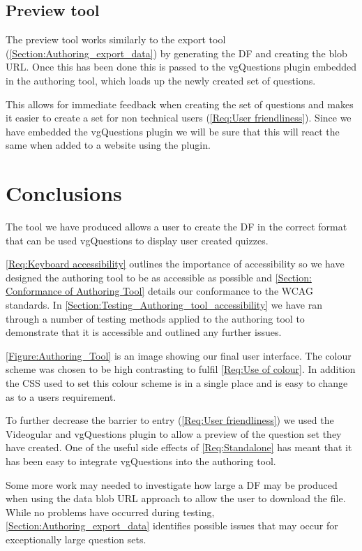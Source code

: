 \subsection{Preview tool}

The preview tool works similarly to the export tool (\autoref{Section:Authoring_export_data}) by generating the \gls{DF} and creating the blob URL. Once this has been done this is passed to the vgQuestions plugin embedded in the authoring tool, which loads up the newly created set of questions.

This allows for immediate feedback when creating the set of questions and makes it easier to create a set for non technical users (\cref{Req:User friendliness}). Since we have embedded the vgQuestions plugin we will be sure that this will react the same when added to a website using the plugin.

\section{Conclusions}
\label{Section:Authoring_Conclusion}

The tool we have produced allows a user to create the \gls{DF} in the correct format that can be used vgQuestions to display user created quizzes.

\cref{Req:Keyboard accessibility} outlines the importance of accessibility so we have designed the authoring tool to be as accessible as possible and \autoref{Section: Conformance of Authoring Tool} details our conformance to the \gls{WCAG} standards. In \autoref{Section:Testing_Authoring_tool_accessibility} we have ran through a number of testing methods applied to the authoring tool to demonstrate that it is accessible and outlined any further issues.

\autoref{Figure:Authoring_Tool} is an image showing our final user interface. The colour scheme was chosen to be high contrasting to fulfil \cref{Req:Use of colour}. In addition the CSS used to set this colour scheme is in a single place and is easy to change as to a users requirement.

To further decrease the barrier to entry (\cref{Req:User friendliness}) we used the \gls{Videogular} and \gls{vgQuestions} plugin to allow a preview of the question set they have created. One of the useful side effects of \cref{Req:Standalone} has meant that it has been easy to integrate \gls{vgQuestions} into the authoring tool.

Some more work may needed to investigate how large a \gls{DF} may be produced when using the data blob URL approach to allow the user to download the file. While no problems have occurred during testing, \autoref{Section:Authoring_export_data} identifies possible issues that may occur for exceptionally large question sets.

